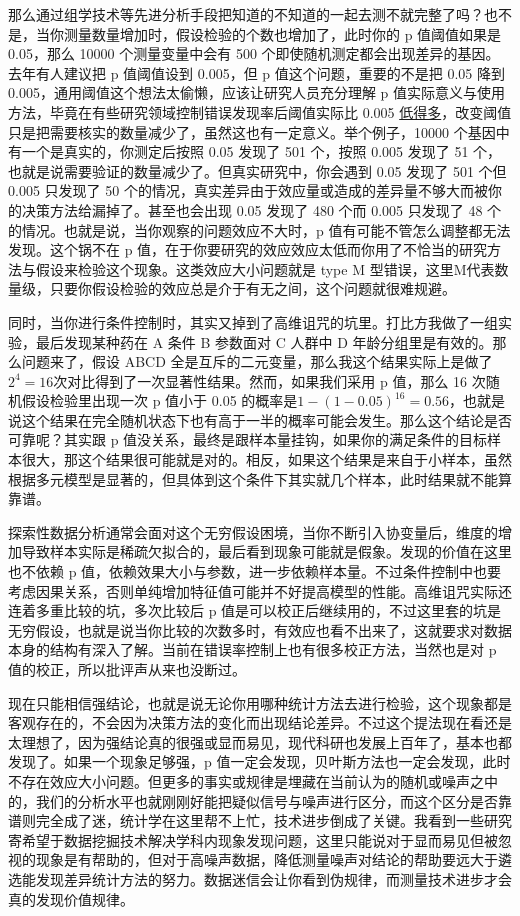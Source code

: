 \documentclass[]{tufte-book}
\begin{document}
那么通过组学技术等先进分析手段把知道的不知道的一起去测不就完整了吗？也不是，当你测量数量增加时，假设检验的个数也增加了，此时你的 p 值阈值如果是 0.05，那么 10000 个测量变量中会有 500 个即使随机测定都会出现差异的基因。去年有人建议把 p 值阈值设到 0.005，但 p 值这个问题，重要的不是把 0.05 降到 0.005，通用阈值这个想法太偷懒，应该让研究人员充分理解 p 值实际意义与使用方法，毕竟在有些研究领域控制错误发现率后阈值实际比 0.005 \href{http://www.nature.com/news/one-size-fits-all-threshold-for-p-values-under-fire-1.22625}{低得多}，改变阈值只是把需要核实的数量减少了，虽然这也有一定意义。举个例子，10000 个基因中有一个是真实的，你测定后按照 0.05 发现了 501 个，按照 0.005 发现了 51 个，也就是说需要验证的数量减少了。但真实研究中，你会遇到 0.05 发现了 501 个但 0.005 只发现了 50 个的情况，真实差异由于效应量或造成的差异量不够大而被你的决策方法给漏掉了。甚至也会出现 0.05 发现了 480 个而 0.005 只发现了 48 个的情况。也就是说，当你观察的问题效应不大时，p 值有可能不管怎么调整都无法发现。这个锅不在 p 值，在于你要研究的效应效应太低而你用了不恰当的研究方法与假设来检验这个现象。这类效应大小问题就是 type M 型错误，这里M代表数量级，只要你假设检验的效应总是介于有无之间，这个问题就很难规避。

同时，当你进行条件控制时，其实又掉到了高维诅咒的坑里。打比方我做了一组实验，最后发现某种药在 A 条件 B 参数面对 C 人群中 D 年龄分组里是有效的。那么问题来了，假设 ABCD 全是互斥的二元变量，那么我这个结果实际上是做了\(2^4 = 16\)次对比得到了一次显著性结果。然而，如果我们采用 p 值，那么 16 次随机假设检验里出现一次 p 值小于 0.05 的概率是\(1-(1-0.05)^{16} = 0.56\)，也就是说这个结果在完全随机状态下也有高于一半的概率可能会发生。那么这个结论是否可靠呢？其实跟 p 值没关系，最终是跟样本量挂钩，如果你的满足条件的目标样本很大，那这个结果很可能就是对的。相反，如果这个结果是来自于小样本，虽然根据多元模型是显著的，但具体到这个条件下其实就几个样本，此时结果就不能算靠谱。

探索性数据分析通常会面对这个无穷假设困境，当你不断引入协变量后，维度的增加导致样本实际是稀疏欠拟合的，最后看到现象可能就是假象。发现的价值在这里也不依赖 p 值，依赖效果大小与参数，进一步依赖样本量。不过条件控制中也要考虑因果关系，否则单纯增加特征值可能并不好提高模型的性能。高维诅咒实际还连着多重比较的坑，多次比较后 p 值是可以校正后继续用的，不过这里套的坑是无穷假设，也就是说当你比较的次数多时，有效应也看不出来了，这就要求对数据本身的结构有深入了解。当前在错误率控制上也有很多校正方法，当然也是对 p 值的校正，所以批评声从来也没断过。

现在只能相信强结论，也就是说无论你用哪种统计方法去进行检验，这个现象都是客观存在的，不会因为决策方法的变化而出现结论差异。不过这个提法现在看还是太理想了，因为强结论真的很强或显而易见，现代科研也发展上百年了，基本也都发现了。如果一个现象足够强，p 值一定会发现，贝叶斯方法也一定会发现，此时不存在效应大小问题。但更多的事实或规律是埋藏在当前认为的随机或噪声之中的，我们的分析水平也就刚刚好能把疑似信号与噪声进行区分，而这个区分是否靠谱则完全成了迷，统计学在这里帮不上忙，技术进步倒成了关键。我看到一些研究寄希望于数据挖掘技术解决学科内现象发现问题，这里只能说对于显而易见但被忽视的现象是有帮助的，但对于高噪声数据，降低测量噪声对结论的帮助要远大于遴选能发现差异统计方法的努力。数据迷信会让你看到伪规律，而测量技术进步才会真的发现价值规律。
\end{document}
